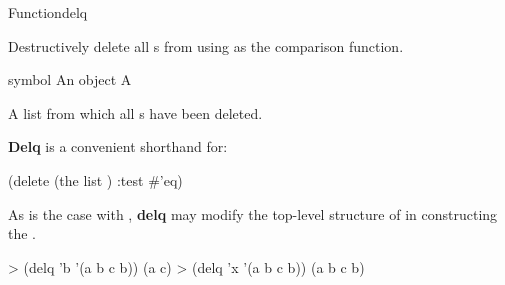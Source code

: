 \documentclass[10pt,twoside,english,pdftex]{article}
\begin{document}

\begin{functiondoc}{Function}{delq}{
    \returns{} } 
%
  
\fnsyntax

\fnpurpose Destructively delete all s from  using 
as the comparison function.

\fnpackage {}

\fnmodule {}

\fnargs
\begin{args}{symbol}
\arg[item] An object
\arg[list] A 
\end{args}

\fnreturns A list from which all s have been deleted.

\fndescription \textbf{Delq} is a convenient shorthand for:
%
\W\supp
\begin{example}
  (delete  (the list ) :test #'eq)
\end{example}
As is the case with , \textbf{delq} may modify the top-level
structure of  in constructing the .

\fnexamples
\W\supp
\begin{example}
> (delq 'b '(a b c b))
(a c)
> (delq 'x '(a b c b))
(a b c b)
\end{example}

\end{functiondoc}

\end{document}
